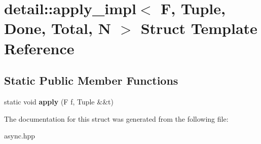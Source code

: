 \hypertarget{structdetail_1_1apply__impl}{}\section{detail\+:\+:apply\+\_\+impl$<$ F, Tuple, Done, Total, N $>$ Struct Template Reference}
\label{structdetail_1_1apply__impl}
\subsection*{Static Public Member Functions}
\begin{DoxyCompactItemize}
\item 
\mbox{\label{structdetail_1_1apply__impl_aeb8ceae999d656f153245ec45b5c7c6c}} 
static void {\bfseries apply} (F f, Tuple \&\&t)
\end{DoxyCompactItemize}


The documentation for this struct was generated from the following file\+:\begin{DoxyCompactItemize}
\item 
async.\+hpp\end{DoxyCompactItemize}
